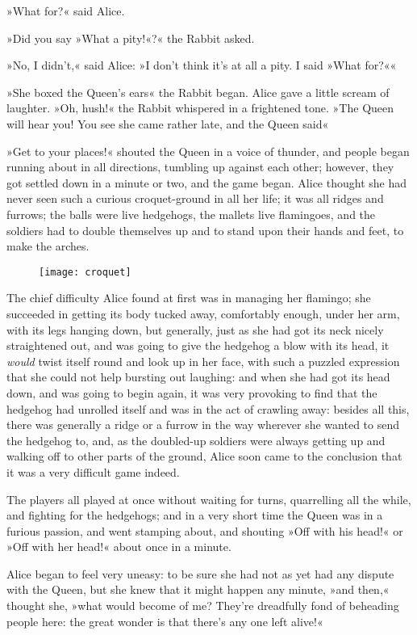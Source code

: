 »What for?« said Alice.

»Did you say »What a pity!«?« the Rabbit asked.

»No, I didn't,« said Alice: »I don't think it's at all a pity. I said »What for?««

»She boxed the Queen's ears\longdash« the Rabbit began. Alice gave a little scream of laughter. »Oh, hush!« the Rabbit whispered in a frightened tone. »The Queen will hear you! You see she came rather late, and the Queen said\longdash«

»Get to your places!« shouted the Queen in a voice of thunder, and people began running about in all directions, tumbling up against each other; however, they got settled down in a minute or two, and the game began. Alice thought she had never seen such a curious croquet-ground in all her life; it was all ridges and furrows; the balls were live hedgehogs, the mallets live flamingoes, and the soldiers had to double themselves up and to stand upon their hands and feet, to make the arches.

\begin{figure}[tbh]
\centering
\texttt{[image: croquet]}
\end{figure}

The chief difficulty Alice found at first was in managing her flamingo; she succeeded in getting its body tucked away, comfortably enough, under her arm, with its legs hanging down, but generally, just as she had got its neck nicely straightened out, and was going to give the hedgehog a blow with its head, it \textit{would} twist itself round and look up in her face, with such a puzzled expression that she could not help bursting out laughing: and when she had got its head down, and was going to begin again, it was very provoking to find that the hedgehog had unrolled itself and was in the act of crawling away: besides all this, there was generally a ridge or a furrow in the way wherever she wanted to send the hedgehog to, and, as the doubled-up soldiers were always getting up and walking off to other parts of the ground, Alice soon came to the conclusion that it was a very difficult game indeed.

The players all played at once without waiting for turns, quarrelling all the while, and fighting for the hedgehogs; and in a very short time the Queen was in a furious passion, and went stamping about, and shouting »Off with his head!« or »Off with her head!« about once in a minute.

Alice began to feel very uneasy: to be sure she had not as yet had any dispute with the Queen, but she knew that it might happen any minute, »and then,« thought she, »what would become of me? They're dreadfully fond of beheading people here: the great wonder is that there's any one left alive!«


